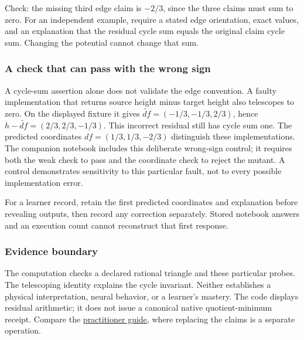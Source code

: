 \documentclass[
  11pt,
]{article}
\begin{document}
Check: the missing third edge claim is \(-2/3\), since the three claims
must sum to zero. For an independent example, require a stated edge
orientation, exact values, and an explanation that the residual cycle
sum equals the original claim cycle sum. Changing the potential cannot
change that sum.

\hypertarget{a-check-that-can-pass-with-the-wrong-sign}{%
\subsubsection{A check that can pass with the wrong
sign}\label{a-check-that-can-pass-with-the-wrong-sign}}

A cycle-sum assertion alone does not validate the edge convention. A
faulty implementation that returns source height minus target height
also telescopes to zero. On the displayed fixture it gives
\(\widetilde{df}=(-1/3,-1/3,2/3)\), hence
\(h-\widetilde{df}=(2/3,2/3,-1/3)\). This incorrect residual still has
cycle sum one. The predicted coordinates \(df=(1/3,1/3,-2/3)\)
distinguish these implementations. The companion notebook includes this
deliberate wrong-sign control; it requires both the weak check to pass
and the coordinate check to reject the mutant. A control demonstrates
sensitivity to this particular fault, not to every possible
implementation error.

For a learner record, retain the first predicted coordinates and
explanation before revealing outputs, then record any correction
separately. Stored notebook answers and an execution count cannot
reconstruct that first response.

\hypertarget{evidence-boundary}{%
\subsubsection{Evidence boundary}\label{evidence-boundary}}

The computation checks a declared rational triangle and these particular
probes. The telescoping identity explains the cycle invariant. Neither
establishes a physical interpretation, neural behavior, or a learner's
mastery. The code displays residual arithmetic; it does not issue a
canonical native quotient-minimum receipt. Compare the
\href{https://github.com/dbccpage/the_symbol_game/blob/52cb5457f6c485ba548cfd292f6012a941ed22cf/omega_engine_atlas/coda_atlas/omega_engine_symbol_game/005_pfp_practitioners_field_manual/paper.md}{practitioner
guide}, where replacing the claims is a separate operation.
\end{document}
